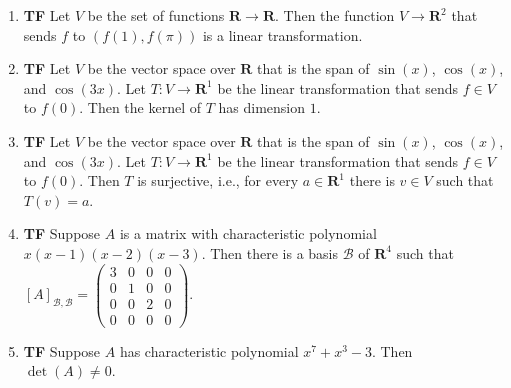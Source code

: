 \documentclass[10pt]{article}
\newcommand{\tf}[1]{\item {\bf {\color{blue}\hspace{1em}T\hspace{1em}F}}\hspace{1em} #1}
\newcommand{\R}{\mathbf{R}}
\begin{document}
\begin{enumerate}
\tf{Let $V$ be the set of functions $\R\to\R$.  Then the function $V\to \R^2$ that sends $f$ to $(f(1), f(\pi))$
is a linear transformation.}

\tf{Let $V$ be the vector space over $\R$ that is the span of $\sin(x)$, $\cos(x)$, and $\cos(3x)$.
Let $T:V\to \R^1$ be the linear transformation that sends $f\in V$ to $f(0)$.
Then the kernel of $T$ has dimension $1$.}

\tf{Let $V$ be the vector space over $\R$ that is the span of $\sin(x)$, $\cos(x)$, and $\cos(3x)$.
Let $T:V\to \R^1$ be the linear transformation that sends $f\in V$ to $f(0)$.
Then $T$ is surjective, i.e., for every $a\in \R^1$ there is $v\in V$ such that $T(v)=a$.}

\tf{Suppose $A$ is a matrix with characteristic polynomial $x(x-1)(x-2)(x-3)$. Then
there is a basis $\mathcal{B}$ of $\R^4$ such that
$[A]_{\mathcal{B},\mathcal{B}} = \left(\begin{array}{rrrr}
3 & 0 & 0 & 0 \\
0 & 1 & 0 & 0 \\
0 & 0 & 2 & 0 \\
0 & 0 & 0 & 0
\end{array}\right).$}

\tf{Suppose $A$ has characteristic polynomial $x^{7} + x^3 - 3$.  Then $\det(A)\neq 0$.}

\end{enumerate}
\end{document}
